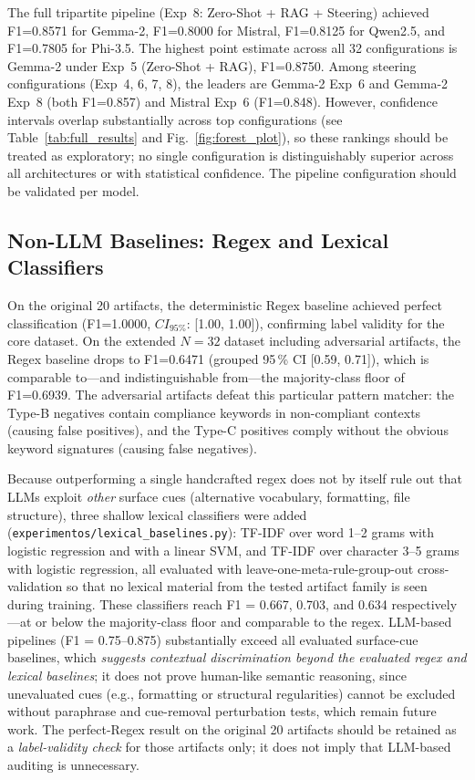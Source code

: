 \documentclass{ieeeaccess}
\begin{document}
The full tripartite pipeline (Exp~8: Zero-Shot + RAG + Steering) achieved F1=0.8571 for Gemma-2, F1=0.8000 for Mistral, F1=0.8125 for Qwen2.5, and F1=0.7805 for Phi-3.5. The highest point estimate across all 32 configurations is Gemma-2 under Exp~5 (Zero-Shot + RAG), F1=0.8750. Among steering configurations (Exp~4, 6, 7, 8), the leaders are Gemma-2 Exp~6 and Gemma-2 Exp~8 (both F1=0.857) and Mistral Exp~6 (F1=0.848). However, confidence intervals overlap substantially across top configurations (see Table~\ref{tab:full_results} and Fig.~\ref{fig:forest_plot}), so these rankings should be treated as exploratory; no single configuration is distinguishably superior across all architectures or with statistical confidence. The pipeline configuration should be validated per model.

\subsection{Non-LLM Baselines: Regex and Lexical Classifiers}

On the original 20 artifacts, the deterministic Regex baseline achieved perfect classification (F1=1.0000, $CI_{95\%}$: [1.00, 1.00]), confirming label validity for the core dataset. On the extended $N=32$ dataset including adversarial artifacts, the Regex baseline drops to F1=0.6471 (grouped 95\,\% CI [0.59, 0.71]), which is comparable to---and indistinguishable from---the majority-class floor of F1=0.6939. The adversarial artifacts defeat this particular pattern matcher: the Type-B negatives contain compliance keywords in non-compliant contexts (causing false positives), and the Type-C positives comply without the obvious keyword signatures (causing false negatives).

Because outperforming a single handcrafted regex does not by itself rule out that LLMs exploit \emph{other} surface cues (alternative vocabulary, formatting, file structure), three shallow lexical classifiers were added (\texttt{experimentos/lexical\_baselines.py}): TF-IDF over word 1--2 grams with logistic regression and with a linear SVM, and TF-IDF over character 3--5 grams with logistic regression, all evaluated with leave-one-meta-rule-group-out cross-validation so that no lexical material from the tested artifact family is seen during training. These classifiers reach F1 = 0.667, 0.703, and 0.634 respectively---at or below the majority-class floor and comparable to the regex. LLM-based pipelines (F1 = 0.75--0.875) substantially exceed all evaluated surface-cue baselines, which \emph{suggests contextual discrimination beyond the evaluated regex and lexical baselines}; it does not prove human-like semantic reasoning, since unevaluated cues (e.g., formatting or structural regularities) cannot be excluded without paraphrase and cue-removal perturbation tests, which remain future work. The perfect-Regex result on the original 20 artifacts should be retained as a \emph{label-validity check} for those artifacts only; it does not imply that LLM-based auditing is unnecessary.
\end{document}
